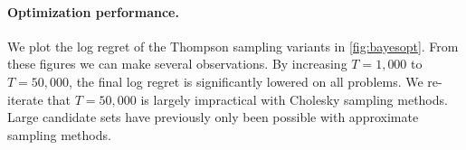 \paragraph{Optimization performance.}
We plot the log regret of the Thompson sampling variants in \cref{fig:bayesopt}.
From these figures we can make several observations.
By increasing $T=1,\!000$ to $T=50,\!000$, the final log regret is significantly lowered on all problems.
We re-iterate that $T=50,\!000$ is largely impractical with Cholesky sampling methods.
Large candidate sets have previously only been possible with approximate sampling methods.
